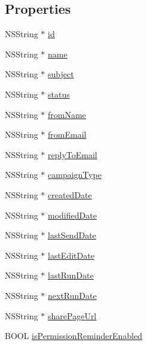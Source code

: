 \subsection*{Properties}
\begin{DoxyCompactItemize}
\item 
N\-S\-String $\ast$ \hyperlink{interface_email_campaign_a53299ba8d3dca7d86269ab1153359c76}{id}
\item 
N\-S\-String $\ast$ \hyperlink{interface_email_campaign_a8585c5b5467eb6556f34ca78b7ea9569}{name}
\item 
N\-S\-String $\ast$ \hyperlink{interface_email_campaign_ab230fdc6dbfbb5b0fe46d81620f30a40}{subject}
\item 
N\-S\-String $\ast$ \hyperlink{interface_email_campaign_abe0d404620abe005f5769e6e764dca82}{status}
\item 
N\-S\-String $\ast$ \hyperlink{interface_email_campaign_a83dce4d2716d423471c754b8a321ec43}{from\-Name}
\item 
N\-S\-String $\ast$ \hyperlink{interface_email_campaign_a4356976b57c32fb34b48b2b821d4d81c}{from\-Email}
\item 
N\-S\-String $\ast$ \hyperlink{interface_email_campaign_afbfc50f3ff466ce62bab7c6dc689ac93}{reply\-To\-Email}
\item 
N\-S\-String $\ast$ \hyperlink{interface_email_campaign_af82030c98d08effb268dc18a03ce2a4e}{campaign\-Type}
\item 
N\-S\-String $\ast$ \hyperlink{interface_email_campaign_a0255af51e37edd773547b9eaa5afd2ac}{created\-Date}
\item 
N\-S\-String $\ast$ \hyperlink{interface_email_campaign_abe927838b66aa3df26c10ad15ff049b9}{modified\-Date}
\item 
N\-S\-String $\ast$ \hyperlink{interface_email_campaign_a8c03ddd9c60f0b5de112617cded5435c}{last\-Send\-Date}
\item 
N\-S\-String $\ast$ \hyperlink{interface_email_campaign_a294dd9079d004dd73c678e4db0ed2de4}{last\-Edit\-Date}
\item 
N\-S\-String $\ast$ \hyperlink{interface_email_campaign_a955fa9ef9a2c0f16999e3333437ab5d0}{last\-Run\-Date}
\item 
N\-S\-String $\ast$ \hyperlink{interface_email_campaign_a511c23998c4d6ad81221e623b7c8a003}{next\-Run\-Date}
\item 
N\-S\-String $\ast$ \hyperlink{interface_email_campaign_ab44698b3df2b86112102ae58cb07a69c}{share\-Page\-Url}
\item 
B\-O\-O\-L \hyperlink{interface_email_campaign_a1e13448b6c632a53783459efa97dd644}{is\-Permission\-Reminder\-Enabled}

\end{DoxyCompactItemize}

